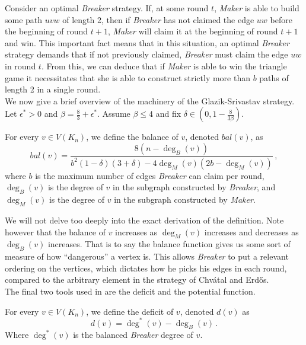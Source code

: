 \documentclass[a4paper,oneside,11pt]{report}
\begin{document}
Consider an optimal \textit{Breaker} strategy. If, at some round $t$, \textit{Maker} is able to build some path $uvw$ of length 2, then if \textit{Breaker} has not claimed the edge $uw$ before the beginning of round $t+1$, \textit{Maker} will claim it at the beginning of round $t+1$ and win. This important fact means that in this situation, an optimal \textit{Breaker} strategy demands that if not previously claimed, \textit{Breaker} must claim the edge $uw$ in round $t$. From this, we can deduce that if \textit{Maker} is able to win the triangle game it necessitates that she is able to construct strictly more than $b$ paths of length 2 in a single round.\\

We now give a brief overview of the machinery of the Glazik-Srivastav strategy.\\

Let $\epsilon^* > 0$ and $\beta = \frac{8}{3}+\epsilon^*$. Assume $\beta \leqslant 4$ and fix $\delta \in (0,1-\frac{8}{3\beta})$. \\

\begin{definition}[balance]

    For every $v \in V(K_n)$, we define the balance of $v$, denoted $bal(v)$, as \[bal(v) = \frac{8(n-\deg_B(v))}{b^2(1-\delta)(3+\delta)-4\deg_M(v)(2b-\deg_M(v))}\, ,\]where $b$ is the maximum number of edges \textit{Breaker} can claim per round, $\deg_B(v)$ is the degree of $v$ in the subgraph constructed by \textit{Breaker}, and $\deg_M(v)$ is the degree of $v$ in the subgraph constructed by \textit{Maker}.
    
\end{definition}

We will not delve too deeply into the exact derivation of the definition. Note however that the balance of $v$ increases as $\deg_M(v)$ increases and decreases as $\deg_B(v)$ increases. That is to say the balance function gives us some sort of measure of how ``dangerous'' a vertex is. This allows \textit{Breaker} to put a relevant ordering on the vertices, which dictates how he picks his edges in each round, compared to the arbitrary element in the strategy of Chvátal and Erdős.\\

The final two tools used in \cite{glazik2022new} are the deficit and the potential function.

\begin{definition}[deficit]

    For every $v \in V(K_n)$, we define the deficit of $v$, denoted $d(v)$ as \[d(v) = \deg^*(v)-\deg_B(v)\,.\] Where $\deg^*(v)$ is the balanced \textit{Breaker} degree of $v$.
    
\end{definition}
\end{document}
